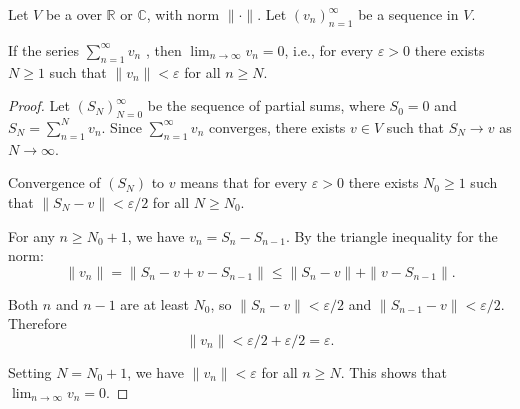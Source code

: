 \begin{lemma} \label{lemma:nth_term_test_for_divergence_of_series}
    Let $V$ be a  over $\mathbb{R}$ or $\mathbb{C}$, with norm $\|\cdot\|$. Let $(v_n)_{n=1}^\infty$ be a sequence in $V$.

    If the series $\sum_{n=1}^\infty v_n$ , then $\lim_{n \to \infty} v_n = 0$, i.e., for every $\varepsilon > 0$ there exists $N \geq 1$ such that $\|v_n\| < \varepsilon$ for all $n \geq N$.
\end{lemma}

\begin{proof}
    Let $(S_N)_{N=0}^\infty$ be the sequence of partial sums, where $S_0 = 0$ and $S_N = \sum_{n=1}^N v_n$. Since $\sum_{n=1}^\infty v_n$ converges, there exists $v \in V$ such that $S_N \to v$ as $N \to \infty$.

    Convergence of $(S_N)$ to $v$ means that for every $\varepsilon > 0$ there exists $N_0 \geq 1$ such that $\|S_N - v\| < \varepsilon/2$ for all $N \geq N_0$.

    For any $n \geq N_0 + 1$, we have $v_n = S_n - S_{n-1}$. By the triangle inequality for the norm:
    $$\|v_n\| = \|S_n - v + v - S_{n-1}\| \leq \|S_n - v\| + \|v - S_{n-1}\|.$$

    Both $n$ and $n-1$ are at least $N_0$, so $\|S_n - v\| < \varepsilon/2$ and $\|S_{n-1} - v\| < \varepsilon/2$. Therefore
    $$\|v_n\| < \varepsilon/2 + \varepsilon/2 = \varepsilon.$$

    Setting $N = N_0 + 1$, we have $\|v_n\| < \varepsilon$ for all $n \geq N$. This shows that $\lim_{n \to \infty} v_n = 0$.
\end{proof}
